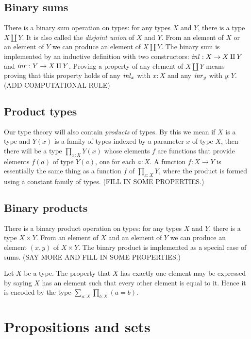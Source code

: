 \subsection{Binary sums}
\label{sec:binsum-types}
There is a binary sum operation on types: for any types $X$ and $Y$, there is a type $X \amalg Y$.  It is also called the \emph{disjoint union}
of $X$ and $Y$.  From an element of $X$ or an element of $Y$ we can produce an element of $X \amalg Y$.  The binary sum is implemented by an
inductive definition with two constructors: $\mathop{{\it inl}_{}} : X \to X \amalg Y$ and
$\mathop{{\it inr}_{}} : Y \to X \amalg Y$. Proving a property of any element of $X \amalg Y$
means proving that this property holds of any $\mathop{{\it inl}_{x}}$ with $x:X$ and any
$\mathop{{\it inr}_{y}}$ with $y:Y$. (ADD COMPUTATIONAL RULE)

\subsection{Product types}
\label{sec:product-types}
Our type theory will also contain \emph{products} of types.  By this we mean if $X$ is a type and $Y(x)$ is a family of types indexed by a
parameter $x$ of type $X$, then there will be a type $\prod _{x:X} Y(x)$ whose elements $f$ are functions that provide elements $f(a)$ of type
$Y(a)$, one for each $a:X$.  A function $f : X \to Y$ is essentially the same thing as a function $f$ of $\prod_{x:X} Y$, where the product is
formed using a constant family of types.  (FILL IN SOME PROPERTIES.)

\subsection{Binary products}
\label{sec:binprod-types}
There is a binary product operation on types: for any types $X$ and $Y$, there is a type $X \times Y$.  From an element of $X$ and an element of
$Y$ we can produce an element $(x,y)$ of $X \times Y$.  The binary product is implemented as a special case of sums.  (SAY MORE AND FILL IN SOME
PROPERTIES.)

Let $X$ be a type.  The property that $X$ has exactly one element may be expressed by saying $X$ has an element such that every other element is
equal to it.  Hence it is encoded by the type $\sum_{a:X} \prod_{b:X} (a=b)$.

\section{Propositions and sets}
\label{sec:propositions-and-sets}

